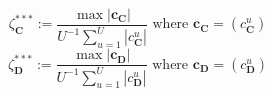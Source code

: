 \begin{equation}
	\zeta_\textbf{C}^{***} := \frac{\max \left|\textbf{c}_\textbf{C}\right|}{U^{-1} \sum_{u=1}^U{\left|c_\textbf{C}^u\right|}} \text{ where } \textbf{c}_\textbf{C} = (c_\textbf{C}^u)
	\label{ch4:equ:par-metric-c}
\end{equation}
\begin{equation}
	\zeta_\textbf{D}^{***} := \frac{\max \left|\textbf{c}_\textbf{D}\right|}{U^{-1} \sum_{u=1}^U{\left|c_\textbf{D}^u\right|}} \text{ where } \textbf{c}_\textbf{D} = (c_\textbf{D}^u)
	\label{ch4:equ:par-metric-d}
\end{equation}
